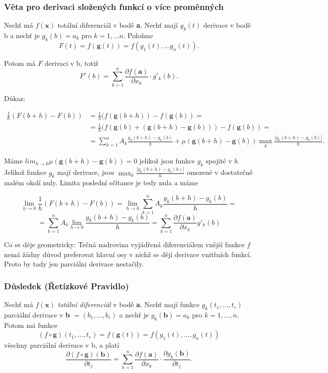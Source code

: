 \documentclass[../main.tex]{subfiles}
\begin{document}
\subsubsection{Věta pro derivaci složených funkcí o více proměnných}
\hspace{1.2mm}
Nechť má $f(\textbf{x})$ totální diferenciál v bodě \textbf{a}. Nechť mají $g_k(t)$ derivace v bodě b a nechť je $g_k(b) = a_k$ pro 
$k = 1,...n.$ Položme
\[F(t) = f(\textbf{g}(t)) = f(g_1(t),...g_n(t)).\]

Potom má $F$ derivaci v b, totiž 
\[F'(b) = \sum^n_{k=1}\frac{\partial f(\textbf{a})}{\partial x_k} \cdot g'_k(b).\]

Důkaz:

\begin{align*} 
 \frac{1}{h} (F(b+h) - F(b)) &= \frac{1}{h}(f(\textbf{g}(b+h)) - f(\textbf{g}(b)) =  \\
 &=\frac{1}{h}(f(\textbf{g}(b) + (\textbf{g}(b+h) - \textbf{g}(b))) - f(\textbf{g}(b)) = \\
 &=\sum^n_{k=1}A_k\frac{g_k(b+h)-g_k(b)}{h} + \mu(\textbf{g}(b+h) - \textbf{g}(b)) \max_k\frac{|g_k(b+h)-g_k(b)|}{h}.
\end{align*}

Máme $lim_{h \rightarrow 0} \mu(\textbf{g}(b+h)-\textbf{g}(b)) = 0$ jelikož jsou funkce $g_k$ spojité v $b$. 
Jelikož funkce $g_k$ mají derivace, jsou $\max_k \frac{|g_k(b+h) - g_k(b)|}{h}$ omezené v dostatečně malém okolí nuly. Limita 
poslední sčítance je tedy nula a máme

\[\lim_{h \rightarrow 0} \frac{1}{h}(F(b+h) - F(b)) = \lim_{h \rightarrow 0} \sum^n_{k = 1} A_k\frac{g_k(b+h)-g_k(b)}{h} = \]
\[= \sum^n_{k = 1}A_k\lim_{h \rightarrow 0} \frac{g_k(b+h) - g_k(b)}{h} = \sum^n_{k = 1}\frac{\partial f(\textbf{a})}{\partial x_k}g'_k(b)\]

\hspace{1.2mm}
Co se děje geometricky: Tečná nadrovina vyjádřená diferenciálem vnější funkce $f$ nemá žádny důvod preferovat hlavní osy v nichž se 
dějí derivace vnitřních funkcí. Proto by tady jen parciálni derivace nestačily. 
\noindent

\subsubsection{Důsledek (Řetízkové Pravidlo)}
\hspace{1.2mm}
Nechť má $f(\textbf{x})$ \textit{totální diferenciál} v bodě \textbf{a}. Nechť mají funkce $g_k(t_1,...,t_r)$ parciální 
derivace v \textbf{b} $= (b_1,...,b_r)$ a nechť je $g_k(\textbf{b}) = a_k$ pro $k = 1,...,n.$ Potom má funkce
\[(f\circ \textbf{g})(t_1,...,t_r) = f(\textbf{g}(t)) = f(g_1(t),...,g_n(t))\]
všechny parciální derivace v b, a platí 
\[\frac{\partial (f \circ \textbf{g})(\textbf{b})}{\partial t_j} = \sum^n_{k=1}\frac{\partial f(\textbf{a})}{\partial x_k}
\cdot \frac{\partial g_k(\textbf{b})}{\partial t_j}.\]
\end{document}
